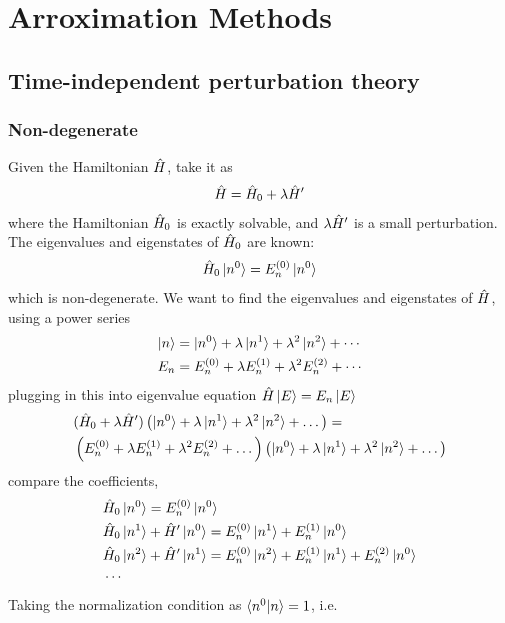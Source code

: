 \chapter{Arroximation Methods}

\section{Time-independent perturbation theory}
\subsection{Non-degenerate}
Given the Hamiltonian $\hat{H}$, take it as 
\begin{align}
    \hat{H} = \hat{H}_0 + \lambda \hat{H}'
\end{align}
where the Hamiltonian $\hat{H}_0$ is exactly solvable, and $\lambda \hat{H}'$ is a small perturbation. The eigenvalues and eigenstates of $\hat{H}_0$ are known: 
\begin{align}
    \hat{H}_0 \ket{n^0} = E_n^{(0)} \ket{n^0}
\end{align}
which is non-degenerate. We want to find the eigenvalues and eigenstates of $\hat{H}$, using a power series 
\begin{align}
    \ket{n} &= \ket{n^0} + \lambda \ket{n^1} + \lambda^2 \ket{n^2} + \cdots \\
    E_n &= E_n^{(0)} + \lambda E_n^{(1)} + \lambda^2 E_n^{(2)} + \cdots
\end{align}
plugging in this into eigenvalue equation $\hat{H} \ket E = E_n \ket E $
\begin{align}
    &(\hat{H}_0 + \lambda \hat{H}') \left(\ket{n^0} + \lambda \ket{n^1} + \lambda^2 \ket{n^2} + \dots\right) =\\
    & \left(E_n^{(0)} + \lambda E_n^{(1)} + \lambda^2 E_n^{(2)} + \dots\right) \left(\ket{n^0} + \lambda \ket{n^1} + \lambda^2 \ket{n^2} + \dots\right)
\end{align}
compare the coefficients, 
\begin{align}
    & \hat{H}_0 \ket{n^0} = E_n^{(0)} \ket{n^0} \\
    & \hat{H}_0 \ket{n^1} + \hat{H}' \ket{n^0} = E_n^{(0)} \ket{n^1} + E_n^{(1)} \ket{n^0} \label{eq:first_order_perturbation_nonde_tin}\\
    & \hat{H}_0 \ket{n^2} + \hat{H}' \ket{n^1} = E_n^{(0)} \ket{n^2} + E_n^{(1)} \ket{n^1} + E_n^{(2)} \ket{n^0} \label{eq:energyinsecond} \\
    & \cdots \notag
\end{align}
Taking the normalization condition as $\braket{n^0|n} = 1$, i.e. 
